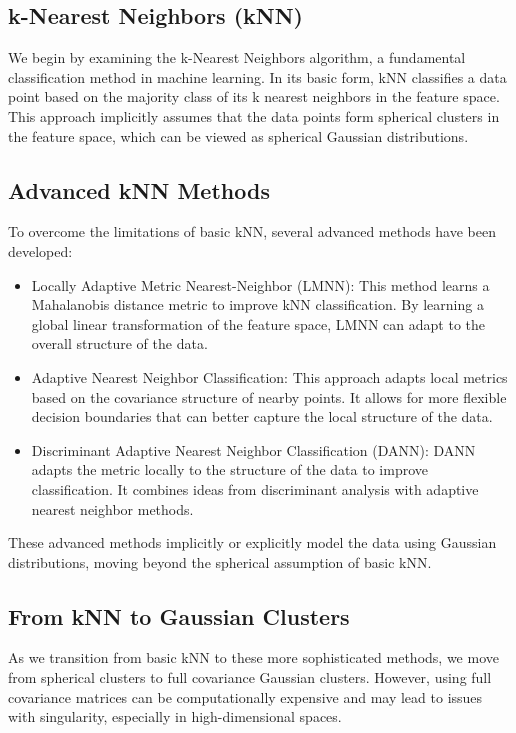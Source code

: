 \documentclass[11pt]{article}
\begin{document}
\subsection{k-Nearest Neighbors (kNN)}

We begin by examining the k-Nearest Neighbors algorithm, a fundamental classification method in machine learning. In its basic form, kNN classifies a data point based on the majority class of its k nearest neighbors in the feature space. This approach implicitly assumes that the data points form spherical clusters in the feature space, which can be viewed as spherical Gaussian distributions.

\subsection{Advanced kNN Methods}

To overcome the limitations of basic kNN, several advanced methods have been developed:

\begin{itemize}
\item Locally Adaptive Metric Nearest-Neighbor (LMNN): This method learns a Mahalanobis distance metric to improve kNN classification. By learning a global linear transformation of the feature space, LMNN can adapt to the overall structure of the data.
\item Adaptive Nearest Neighbor Classification: This approach adapts local metrics based on the covariance structure of nearby points. It allows for more flexible decision boundaries that can better capture the local structure of the data.
\item Discriminant Adaptive Nearest Neighbor Classification (DANN): DANN adapts the metric locally to the structure of the data to improve classification. It combines ideas from discriminant analysis with adaptive nearest neighbor methods.
\end{itemize}

These advanced methods implicitly or explicitly model the data using Gaussian distributions, moving beyond the spherical assumption of basic kNN.

\subsection{From kNN to Gaussian Clusters}

As we transition from basic kNN to these more sophisticated methods, we move from spherical clusters to full covariance Gaussian clusters. However, using full covariance matrices can be computationally expensive and may lead to issues with singularity, especially in high-dimensional spaces.
\end{document}

